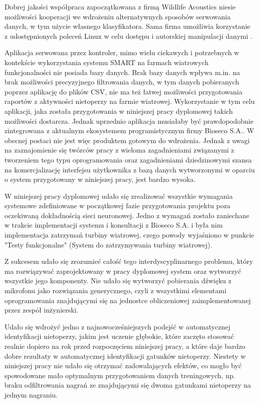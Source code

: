 \documentclass{sprz}
\begin{document}
Dobrej jakości współpraca zapoczątkowana z firmą Wildlife Acoustics niesie możliwości kooperacji we wdrożeniu alternatywnych sposobów serwowania danych, w tym użycie własnego klasyfikatora. Sama firma umożliwia korzystanie z udostępnionych poleceń Linux w celu dostępu i autorskiej manipulacji danymi \cite{smart-linux-guide}.

Aplikacja serwowana przez kontroler, mimo wielu ciekawych i potrzebnych w kontekście wykorzystania systemu SMART na farmach wiatrowych funkcjonalności nie posiada bazy danych. Brak bazy danych wpływa m.in. na brak możliwości precyzyjnego filtrowania danych, w tym danych pobieranych poprzez aplikację do plików CSV, nie ma też łatwej możliwości przygotowania raportów z aktywności nietoperzy na farmie wiatrowej. Wykorzystanie w tym celu aplikacji, jaka została przygotowania w niniejszej pracy dyplomowej takich możliwości dostarcza. Jednak uprzednio aplikacja musiałaby być prawdopodobnie zintegrowana z aktualnym ekosystemem programistycznym firmy Bioseco S.A.. W obecnej postaci nie jest więc produktem gotowym do wdrożenia. Jednak z uwagi na zaznajomienie się twórców pracy z wieloma zagadnieniami związanymi z tworzeniem tego typu oprogramowania oraz zagadnieniami dziedzinowymi szansa na komercjalizację interfejsu użytkownika z bazą danych wytworzonymi w oparciu o system przygotowany w niniejszej pracy, jest bardzo wysoka. 

W niniejszej pracy dyplomowej udało się zrealizować wszystkie wymagania systemowe zdefiniowane w początkowej fazie przygotowania projektu poza oczekiwaną dokładnością sieci neuronowej. Jedno z wymagań zostało zaniechane w trakcie implementacji systemu i konsultacji z Bioseco S.A. i była nim implementacja zatrzymań turbiny wiatrowej, czego powody wyjaśniono w punkcie "Testy funkcjonalne" (System do zatrzymywania turbiny wiatrowej). 

Z sukcesem udało się zrozumieć całość tego interdyscyplinarnego problemu, który ma rozwiązywać zaprojektowany w pracy dyplomowej system oraz wytworzyć wszystkie jego komponenty. Nie udało się wytworzyć pobierania dźwięku z mikrofonu jako rozwiązania generycznego, czyli z wszystkimi elementami oprogramowania znajdującymi się na jednostce obliczeniowej zaimplementowanej przez zespół inżynierski. 

Udało się wdrożyć jedno z najnowocześniejszych podejść w automatycznej identyfikacji nietoperzy, jakim jest uczenie głębokie, które zaczęto stosować realnie dopiero na rok przed rozpoczęciem niniejszej pracy, a które daje bardzo dobre rezultaty w automatycznej identyfikacji gatunków nietoperzy. Niestety w niniejszej pracy nie udało się otrzymać zadowalających efektów, co mogło być spowodowane mało optymalnym przygotowaniem danych treningowych, np. braku odfiltrowania nagrań ze znajdującymi się dwoma gatunkami nietoperzy na jednym nagraniu.
\end{document}
